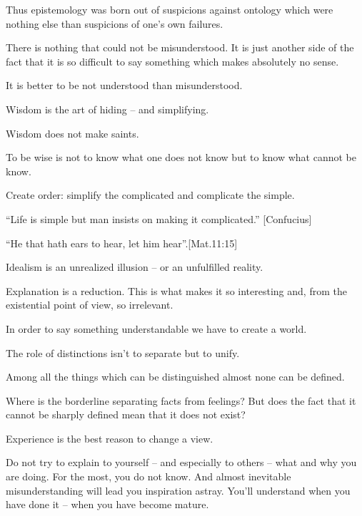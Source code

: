 
Thus epistemology was born out of suspicions against ontology which
were nothing else than suspicions of one's own failures.

\pa\label{anymisunderstood}
There is nothing that could not be misunderstood. It is just another
side of the fact that it is so difficult to say something which makes
absolutely no sense.

\pa It is better to be not understood than misunderstood.  

\pa
Wisdom is the art of hiding -- and simplifying.

\pa
Wisdom does not make saints.

\pa
To be wise is not to know what one does not know but to know what
cannot be know.

\pa
Create order: 
simplify the complicated and complicate the simple.

\pa
``Life is simple but man insists on making it complicated.'' [Confucius]

\pa
``He that hath ears to hear, let him hear''.[Mat.11:15]

\pa
Idealism is an unrealized illusion -- or an unfulfilled reality.

\pa
Explanation is a reduction. This is what makes it so interesting and, 
from the existential point of view, so irrelevant.

\pa
In order to say something understandable we have to create a world.

\pa
The role of distinctions isn't to separate but to unify.

\pa
Among all the things which can be distinguished almost none can be defined.

\pa
Where is the borderline separating facts from feelings? But does the fact 
that it cannot be sharply defined mean that it does not exist?

\pa
Experience is the best reason to change a view.

\pa
Do not try to explain to yourself -- and especially to others -- what and why you are
doing. For the most, you do not know. And almost inevitable misunderstanding will lead you
inspiration astray. You'll understand when you have done it -- when you have become mature.


